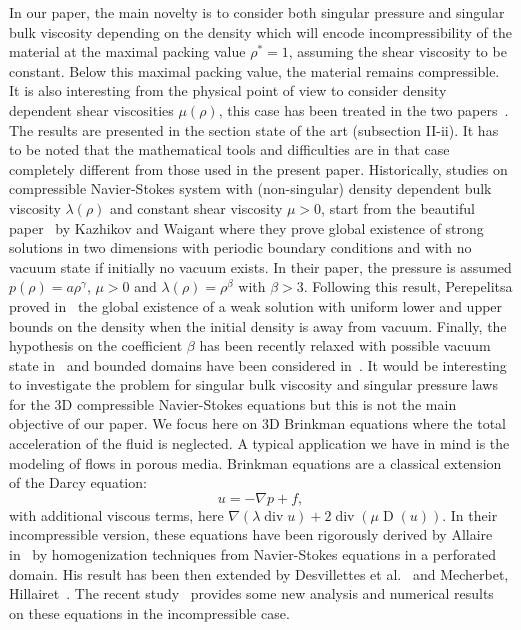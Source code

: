 \documentclass[10pt]{amsart}
\newcommand{\<}{\bigl\langle}
\renewcommand{\>}{\bigr\rangle}
\theoremstyle{definition}
\theoremstyle{remark}
\DeclareMathOperator{\Div}{div}
\DeclareMathOperator{\D}{D}
\begin{document}
In our paper, the main novelty is to consider both singular pressure and singular bulk viscosity depending on the density which will encode incompressibility of the material at the maximal packing value $\rho^*=1$, assuming the shear viscosity to be constant.
Below this maximal packing value, the material remains compressible.
It is also interesting from the physical point of view to consider density dependent shear viscosities $\mu(\rho)$, this case has been treated in the two papers~\cite{perrin2016,perrin2017}.
The results are presented in the section state of the art (subsection II-ii).
It has to be noted that the mathematical tools and difficulties are in that case completely different from those used in the present paper.
Historically, studies on compressible Navier-Stokes system with (non-singular) density dependent bulk viscosity $\lambda(\rho)$ and constant shear viscosity $\mu >0$, start from the beautiful paper~\cite{vaigant1995} by {Kazhikov} and {Waigant} where they prove global existence of strong solutions in two dimensions with periodic boundary conditions and with no vacuum state if initially no vacuum exists. In their paper, the pressure is assumed $p(\rho) = a \rho^\gamma$, $\mu > 0$ and $\lambda(\rho)= \rho^\beta$ with $\beta >3$.
Following this result, {Perepelitsa} proved in~\cite{perepelitsa2006} the global existence of a weak solution with uniform lower and upper bounds on the density when the initial density is away from vacuum.
Finally, the hypothesis on the coefficient $\beta$ has been recently relaxed with possible vacuum state in~\cite{huli2016} and bounded domains have been considered in~\cite{ducomet2013}.
It would be interesting to investigate the problem for singular bulk viscosity and singular pressure laws for the 3D compressible Navier-Stokes equations but this is not the main objective of our paper. We focus here on 3D Brinkman equations where the total acceleration of the fluid is neglected. A typical application we have in mind is the modeling of flows in porous media.
Brinkman equations are a classical extension of the Darcy equation:
\[
u = -\nabla p + f,
\]
with additional viscous terms, here $\nabla(\lambda\Div u) + 2\Div(\mu \D(u))$.
In their incompressible version, these equations have been rigorously derived by {Allaire} in~\cite{allaire1991} by homogenization techniques from Navier-Stokes equations in a perforated domain.
His result has been then extended by {Desvillettes} et al.\ \cite{desvillettes2008} and {Mecherbet}, {Hillairet}~\cite{mecherbet2018}.
The recent study~\cite{Nasser2017} provides some new analysis and numerical results on these equations in the incompressible case.
\end{document}
